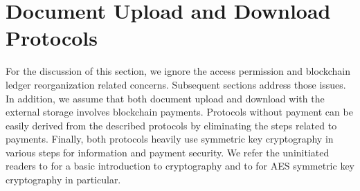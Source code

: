 \documentclass[conference]{IEEEtran}
\begin{document}


\section{Document Upload and Download Protocols}
\label{s-updown}
For the discussion of this section, we ignore the access permission and blockchain ledger reorganization related concerns. Subsequent sections address those issues. In addition, we assume that both document upload and download with the external storage involves blockchain payments. Protocols without payment can be easily derived from the described protocols by eliminating the steps related to payments. Finally, both protocols heavily use symmetric key cryptography in various steps for information and payment security. We refer the uninitiated readers to \cite{1455525} for a basic introduction to cryptography and to \cite{Daemen99aesproposal:} for AES symmetric key cryptography in particular. 
\end{document}
